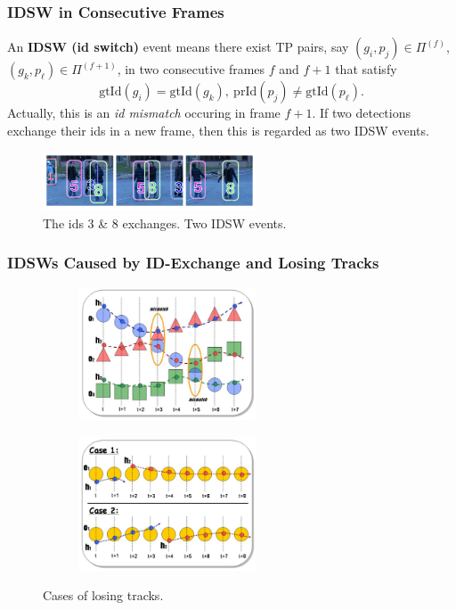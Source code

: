 \documentclass[slidetop, mathserif, dvipsnames]{beamer}
\begin{document}
\begin{frame}
	\frametitle{IDSW in Consecutive Frames}
			
	An {\bf IDSW (id switch)} event means there exist TP pairs, say $(g_i, p_j)\in\Pi^{(f)}$,
	$(g_k, p_\ell)\in\Pi^{(f+1)}$, in two consecutive frames
	$f$ and $f+1$ that satisfy
	\[
		\text{gtId}(g_i) = \text{gtId}(g_k),\ 
		\text{prId}(p_j) \neq \text{gtId}(p_\ell).
	\]
	Actually, this is an \emph{id mismatch} occuring in frame $f+1$.
	If two detections exchange their ids in a new frame,
	then this is regarded as two IDSW events.
	\begin{figure}
		\includegraphics[width=180pt]{pics/fig3.png}
		\caption{The ids 3 \& 8 exchanges. Two IDSW events.}
	\end{figure}
			    
\end{frame}

\begin{frame}
	\frametitle{IDSWs Caused by ID-Exchange and Losing Tracks}

	\begin{figure}
		\begin{subfigure}{.49\textwidth}
			\includegraphics[width=150pt]{pics/fig16.png}
		\end{subfigure}
		\begin{subfigure}{.49\textwidth}
			\includegraphics[width=150pt]{pics/fig17.png}
		\end{subfigure}
		\caption{Cases of losing tracks.}
	\end{figure}
\end{frame}
\end{document}

